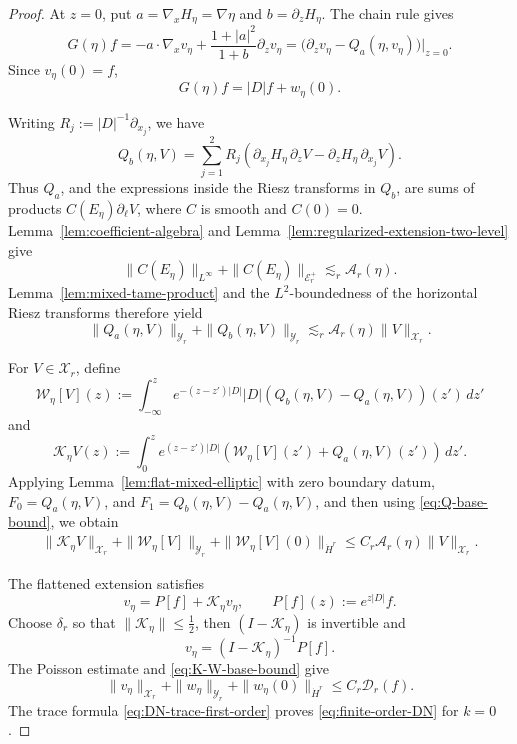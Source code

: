\documentclass[10pt,a4paper]{amsart}
\begin{document}
\begin{proof}
At \(z=0\), put \(a=\nabla_xH_\eta=\nabla\eta\) and
\(b=\partial_zH_\eta\).  The chain rule gives
\[
 G(\eta)f
 =-a\cdot\nabla_xv_\eta+\frac{1+|a|^2}{1+b}\partial_zv_\eta
 =\bigl(\partial_zv_\eta-Q_a(\eta,v_\eta)\bigr)\big|_{z=0}.
\]
Since \(v_\eta(0)=f\),
\begin{equation}
\label{eq:DN-trace-first-order}
 G(\eta)f=|D|f+w_\eta(0).
\end{equation}

Writing \(R_j:=|D|^{-1}\partial_{x_j}\), we have
\[
 Q_b(\eta,V) = \sum_{j=1}^2 R_j
 \left(  \partial_{x_j}H_\eta\,\partial_zV
  -\partial_zH_\eta\,\partial_{x_j}V
 \right).
\]
Thus \(Q_a\), and the expressions inside the Riesz transforms in
\(Q_b\), are sums of products \(C(E_\eta)\partial_\ell V\), where
\(C\) is smooth and \(C(0)=0\). 
Lemma~\ref{lem:coefficient-algebra} and
Lemma~\ref{lem:regularized-extension-two-level} give
\[
 \|C(E_\eta)\|_{L^\infty} + \|C(E_\eta)\|_{\mathcal E_r^+} \lesssim_r \mathcal A_r(\eta).
\]
Lemma~\ref{lem:mixed-tame-product} and the \(L^2\)-boundedness of the horizontal Riesz transforms therefore yield
\begin{equation}\label{eq:Q-base-bound}
 \|Q_a(\eta,V)\|_{\mathcal Y_r}
 + \|Q_b(\eta,V)\|_{\mathcal Y_r}
 \lesssim_r \mathcal A_r(\eta)\|V\|_{\mathcal X_r}.
\end{equation}

For \(V\in\mathcal X_r\), define
\begin{equation*}
 \mathcal W_\eta[V](z) := \int_{-\infty}^z e^{-(z-z')|D|}|D| \left( Q_b(\eta,V)-Q_a(\eta,V) \right)(z')\,dz'
\end{equation*}
and
\begin{equation*}
 \mathcal K_\eta V(z) := \int_0^z e^{(z-z')|D|} \left( \mathcal W_\eta[V](z') + Q_a(\eta,V)(z') \right)\,dz'.
\end{equation*}
Applying Lemma~\ref{lem:flat-mixed-elliptic} with zero boundary datum,
\(F_0=Q_a(\eta,V)\), and \(F_1=Q_b(\eta,V)-Q_a(\eta,V)\), and then using
\eqref{eq:Q-base-bound}, we obtain
\begin{equation} \label{eq:K-W-base-bound}
\begin{aligned}
 \|\mathcal K_\eta V\|_{\mathcal X_r} + \|\mathcal W_\eta[V]\|_{\mathcal Y_r} + \|\mathcal W_\eta[V](0)\|_{\dot H^r}\leq C_r\mathcal A_r(\eta) \|V\|_{\mathcal X_r}.
\end{aligned}
\end{equation}

The flattened extension satisfies
\begin{equation*}
 v_\eta = P[f]+\mathcal K_\eta v_\eta, \qquad P[f](z):=e^{z|D|}f.
\end{equation*}
Choose \(\delta_r\) so that \(\|\mathcal K_\eta\| \leq\frac12\), then $(I-\mathcal K_\eta)$ is invertible and
\[
 v_\eta = (I-\mathcal K_\eta)^{-1}P[f].
\]
The Poisson estimate and \eqref{eq:K-W-base-bound} give
\begin{equation*}
 \|v_\eta\|_{\mathcal X_r} + \|w_\eta\|_{\mathcal Y_r} + \|w_\eta(0)\|_{\dot H^r} \leq C_r\mathcal D_r(f).
\end{equation*}
The trace formula \eqref{eq:DN-trace-first-order} proves
\eqref{eq:finite-order-DN} for \(k=0\).


\end{proof}
\end{document}
